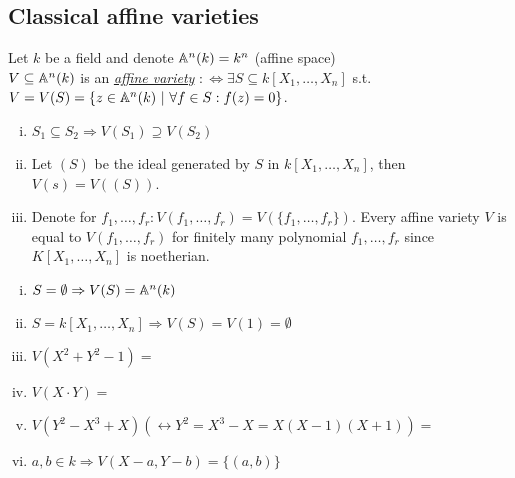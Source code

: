 \subsection{Classical affine varieties}
\begin{defi}
Let $k$ be a field and denote $\mathbb{A}^n(k)=k^n$ (\glqq affine space\grqq)\\
$V\subseteq \mathbb{A}^n(k)$ is an \emph{\underline{affine variety}} $: \iff \exists S \subseteq k[X_1, \dots, X_n]$ s.t. $V=V(S)=\{z \in \mathbb{A}^n(k) \ | \ \forall f \in S: f(z)=0\}$.
\end{defi}

\begin{Bem}
\begin{enumerate}[i)]
\item $S_1 \subseteq S_2 \Rightarrow V(S_1) \supseteq V(S_2)$
\item Let $(S)$ be the ideal generated by $S$ in $k[X_1, \dots, X_n]$, then $V(s)=V( (S) )$.
\item Denote for $f_1, \dots, f_r: V(f_1, \dots, f_r)=V(\{f_1, \dots, f_r\})$. Every affine variety $V$ is equal to $V(f_1, \dots, f_r)$ for finitely many polynomial $f_1, \dots, f_r$ since $K[X_1, \dots, X_n]$ is noetherian.
\end{enumerate}
\end{Bem}

\begin{Bsp}
\begin{enumerate}[i)]
\item $S= \emptyset \Rightarrow V(S)=\mathbb{A}^n(k)$
\item $S=k[X_1, \dots, X_n] \Rightarrow V(S)=V(1)=\emptyset$
\item $V(X^2+Y^2-1) = $ 
\item $V(X \cdot Y) = $ 
\item $V(Y^2-X^3+X) (\leftrightarrow Y^2=X^3-X=X(X-1)(X+1))=$
\item $a,b \in k \Rightarrow V(X-a, Y-b)=\{(a,b)\}$
\end{enumerate}
\end{Bsp}

